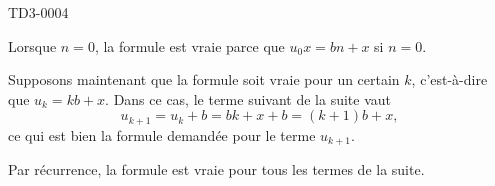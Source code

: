 
\begin{corrige}{TD3-0004}

	Lorsque $n=0$, la formule est vraie parce que $u_0x=bn+x$ si $n=0$.

	Supposons maintenant que la formule soit vraie pour un certain $k$, c'est-à-dire que $u_k=kb+x$. Dans ce cas, le terme suivant de la suite vaut
	\begin{equation}
		u_{k+1}=u_k+b=bk+x+b=(k+1)b+x,
	\end{equation}
	ce qui est bien la formule demandée pour le terme $u_{k+1}$.

	Par récurrence, la formule est vraie pour tous les termes de la suite.

\end{corrige}
